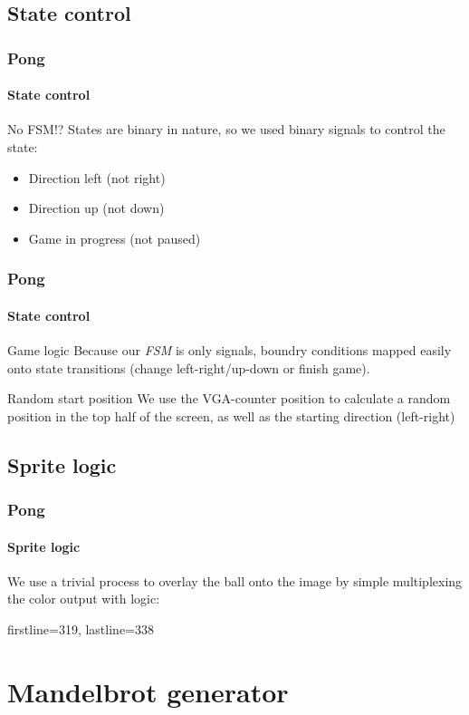 \documentclass{beamer}
\begin{document}
\subsection{State control}
\begin{frame}
    \frametitle{Pong}
    \framesubtitle{State control}
    \begin{alertblock}{No FSM!?}
        States are binary in nature,
        so we used binary signals to control the state:
        \begin{itemize}
            \item Direction left (not right)
            \item Direction up (not down)
            \item Game in progress (not paused)
        \end{itemize}
    \end{alertblock}
\end{frame}

\begin{frame}
    \frametitle{Pong}
    \framesubtitle{State control }
    \begin{block}{Game logic}
        Because our \emph{FSM} is only signals,
        boundry conditions mapped easily onto state transitions (change left-right/up-down or finish game).
    \end{block}
    \begin{block}{Random start position}
        We use the VGA-counter position to calculate a random position in the top half of the screen,
        as well as the starting direction (left-right)
    \end{block}
\end{frame}

\subsection{Sprite logic}
\begin{frame}[fragile]
    \frametitle{Pong}
    \framesubtitle{Sprite logic}
    We use a trivial process to overlay the ball onto the image by simple multiplexing the color output with logic:
    
    firstline=319, lastline=338
\end{frame}



\section{Mandelbrot generator}
\begin{frame}
    \sectionpage
\end{frame}
\end{document}
